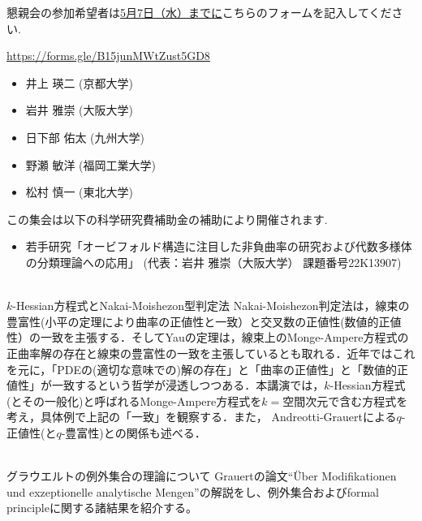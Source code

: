 \documentclass[dvipdfmx,a4paper,12pt]{article}
\theoremstyle{plain} %
\theoremstyle{definition} %
\begin{document}
懇親会の参加希望者は\underline{5月7日（水）までに}こちらのフォームを記入してください.
\begin{center}
  \url{https://forms.gle/B15junMWtZust5GD8}
  \end{center}

\vskip5mm
  
\begin{itemize}
  \setlength{\parskip}{0cm} 
  \setlength{\itemsep}{0cm}
\item 井上 瑛二 (京都大学)
\item 岩井 雅崇 (大阪大学)
\item 日下部 佑太 (九州大学)
\item 野瀬 敏洋 (福岡工業大学)
\item 松村 慎一 (東北大学)
  \end{itemize}

\vskip5mm


この集会は以下の科学研究費補助金の補助により開催されます.
\begin{itemize}
  \setlength{\parskip}{0cm} 
  \setlength{\itemsep}{0cm}
\item 若手研究「オービフォルド構造に注目した非負曲率の研究および代数多様体の分類理論への応用」
 (代表：岩井 雅崇（大阪大学） 課題番号22K13907)
  \end{itemize}



\newpage

\vskip5mm

\vskip5mm
\\
$k$-Hessian方程式とNakai-Moishezon型判定法
\vskip3mm
Nakai-Moishezon判定法は，線束の豊富性(小平の定理により曲率の正値性と一致）と交叉数の正値性(数値的正値性）の一致を主張する．そしてYauの定理は，線束上のMonge-Ampere方程式の正曲率解の存在と線束の豊富性の一致を主張しているとも取れる．近年ではこれを元に，「PDEの(適切な意味での)解の存在」と「曲率の正値性」と「数値的正値性」が一致するという哲学が浸透しつつある．本講演では，$k$-Hessian方程式(とその一般化)と呼ばれるMonge-Ampere方程式を$k=$空間次元で含む方程式を考え，具体例で上記の「一致」を観察する．また， Andreotti-Grauertによる$q$-正値性(と$q$-豊富性)との関係も述べる．
\vskip8mm

\\
グラウエルトの例外集合の理論について 
\vskip3mm
Grauertの論文``\"Uber Modifikationen und exzeptionelle analytische Mengen''の解説をし、例外集合およびformal principleに関する諸結果を紹介する。 
\vskip8mm
\end{document}

